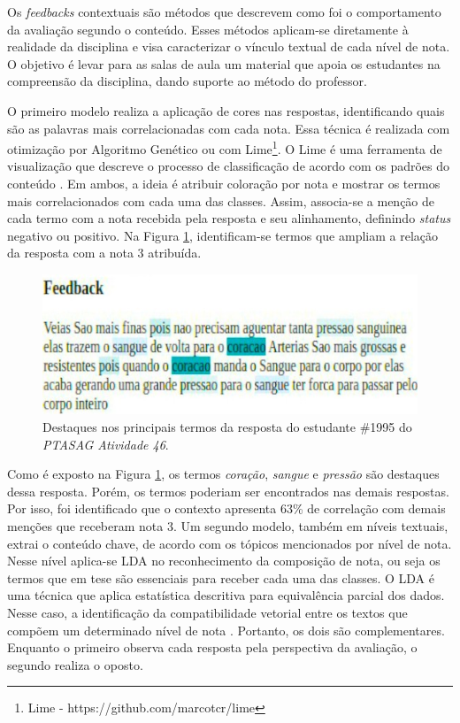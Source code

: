 Os \textit{feedbacks} contextuais são métodos que descrevem como foi o comportamento da avaliação segundo o conteúdo. Esses métodos aplicam-se diretamente à realidade da disciplina e visa caracterizar o vínculo textual de cada nível de nota. O objetivo é levar para as salas de aula um material que apoia os estudantes na compreensão da disciplina, dando suporte ao método do professor.

O primeiro modelo realiza a aplicação de cores nas respostas, identificando quais são as palavras mais correlacionadas com cada nota. Essa técnica é realizada com otimização por Algoritmo Genético \cite{spalenza2016a} ou com Lime\footnote{Lime - https://github.com/marcotcr/lime}. O Lime é uma ferramenta de visualização que descreve o processo de classificação de acordo com os padrões do conteúdo \cite{ribeiro2016}. Em ambos, a ideia é atribuir coloração por nota e mostrar os termos mais correlacionados com cada uma das classes. Assim, associa-se a menção de cada termo com a nota recebida pela resposta e seu alinhamento, definindo \textit{status} negativo ou positivo. Na Figura \ref{fig-highlight-46}, identificam-se termos que ampliam a relação da resposta com a nota 3 atribuída.

\begin{figure}[!h]
 \centering
 \includegraphics[width=.75\textwidth]{figuras/exemplo/highlight.jpeg}
 \caption{Destaques nos principais termos da resposta do estudante \#1995 do \textit{PTASAG Atividade 46}.}
 \label{fig-highlight-46}
\end{figure}

Como é exposto na Figura \ref{fig-highlight-46}, os termos \textit{coração}, \textit{sangue} e \textit{pressão} são destaques dessa resposta. Porém, os termos poderiam ser encontrados nas demais respostas. Por isso, foi identificado que o contexto apresenta 63\% de correlação com demais menções que receberam nota 3. Um segundo modelo, também em níveis textuais, extrai o conteúdo chave, de acordo com os tópicos mencionados por nível de nota. Nesse nível aplica-se LDA \cite{hoffman2013} no reconhecimento da composição de nota, ou seja os termos que em tese são essenciais para receber cada uma das classes. O LDA é uma técnica que aplica estatística descritiva para equivalência parcial dos dados. Nesse caso, a identificação da compatibilidade vetorial entre os textos que compõem um determinado nível de nota \cite{sahu2020}. Portanto, os dois são complementares. Enquanto o primeiro observa cada resposta pela perspectiva da avaliação, o segundo realiza o oposto. 

